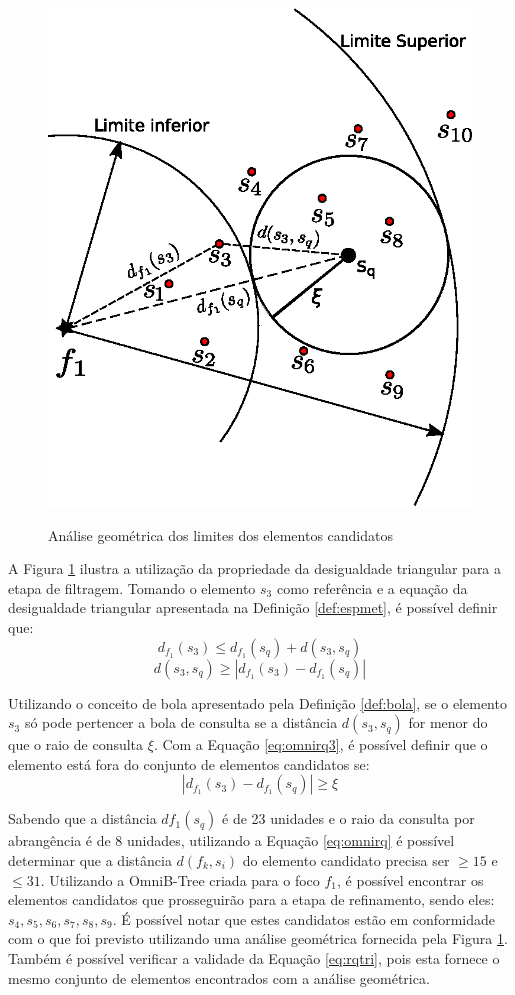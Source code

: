 \begin{figure}[H]
\centering
\caption{Análise geométrica dos limites dos elementos candidatos}
\includegraphics[width=.55\textwidth]{dados/figuras/rg_ex2.eps}
\label{fig:rgex2}
\end{figure}
A Figura \ref{fig:rgex2} ilustra a utilização da propriedade da desigualdade triangular para a etapa de filtragem. Tomando o elemento $s_3$ como referência e a equação da desigualdade triangular apresentada
na Definição \ref{def:espmet}, é possível definir que:
\begin{equation} \label{eq:omnirq2}
d_{f_1}(s_3) \leq d_{f_1}(s_q) + d(s_3, s_q)
\end{equation}
\begin{equation} \label{eq:omnirq3}
d(s_3, s_q) \geq |d_{f_1}(s_3) - d_{f_1}(s_q)|
\end{equation}\par
Utilizando o conceito de bola apresentado pela Definição \ref{def:bola}, se o elemento $s_3$ só pode pertencer a bola de consulta se a distância
$d(s_3, s_q)$ for menor do que o raio de consulta $\xi$. Com a Equação \ref{eq:omnirq3}, é possível definir que o elemento está fora do conjunto
de elementos candidatos se:
\begin{equation} \label{eq:rqtri}
 |d_{f_1}(s_3) - d_{f_1}(s_q)| \geq \xi
\end{equation}\par
Sabendo que a distância $df_1(s_q)$ é de 23 unidades e o raio da consulta por abrangência é de 8 unidades, utilizando a Equação \ref{eq:omnirq} é possível determinar que a distância $d(f_k, s_i)$ do elemento candidato precisa ser $\geq 15$ e $\leq 31$.
Utilizando a OmniB-Tree criada para o foco $f_1$, é possível encontrar os elementos candidatos que prosseguirão para a etapa de refinamento, sendo eles: $s_4, s_5, s_6, s_7, s_8, s_9$. É possível notar que estes candidatos estão em conformidade com o que
foi previsto utilizando uma análise geométrica fornecida pela Figura \ref{fig:rgex2}. Também é possível verificar a validade da Equação
\ref{eq:rqtri}, pois esta fornece o mesmo conjunto de elementos encontrados com a análise geométrica.\par

